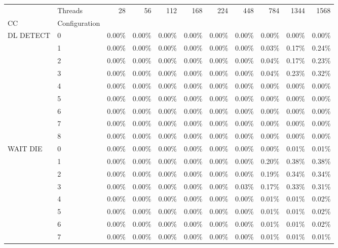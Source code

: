 \begin{tabular}{llrrrrrrrrr}
\toprule
       & Threads &  28   &  56   &  112  &  168  &  224  &  448  &  784  &  1344 &  1568 \\
CC & Configuration &       &       &       &       &       &       &       &       &       \\
\midrule
DL DETECT & 0 & 0.00\% & 0.00\% & 0.00\% & 0.00\% & 0.00\% & 0.00\% & 0.00\% & 0.00\% & 0.00\% \\
       & 1 & 0.00\% & 0.00\% & 0.00\% & 0.00\% & 0.00\% & 0.00\% & 0.03\% & 0.17\% & 0.24\% \\
       & 2 & 0.00\% & 0.00\% & 0.00\% & 0.00\% & 0.00\% & 0.00\% & 0.04\% & 0.17\% & 0.23\% \\
       & 3 & 0.00\% & 0.00\% & 0.00\% & 0.00\% & 0.00\% & 0.00\% & 0.04\% & 0.23\% & 0.32\% \\
       & 4 & 0.00\% & 0.00\% & 0.00\% & 0.00\% & 0.00\% & 0.00\% & 0.00\% & 0.00\% & 0.00\% \\
       & 5 & 0.00\% & 0.00\% & 0.00\% & 0.00\% & 0.00\% & 0.00\% & 0.00\% & 0.00\% & 0.00\% \\
       & 6 & 0.00\% & 0.00\% & 0.00\% & 0.00\% & 0.00\% & 0.00\% & 0.00\% & 0.00\% & 0.00\% \\
       & 7 & 0.00\% & 0.00\% & 0.00\% & 0.00\% & 0.00\% & 0.00\% & 0.00\% & 0.00\% & 0.00\% \\
       & 8 & 0.00\% & 0.00\% & 0.00\% & 0.00\% & 0.00\% & 0.00\% & 0.00\% & 0.00\% & 0.00\% \\
WAIT DIE & 0 & 0.00\% & 0.00\% & 0.00\% & 0.00\% & 0.00\% & 0.00\% & 0.00\% & 0.01\% & 0.01\% \\
       & 1 & 0.00\% & 0.00\% & 0.00\% & 0.00\% & 0.00\% & 0.00\% & 0.20\% & 0.38\% & 0.38\% \\
       & 2 & 0.00\% & 0.00\% & 0.00\% & 0.00\% & 0.00\% & 0.00\% & 0.19\% & 0.34\% & 0.34\% \\
       & 3 & 0.00\% & 0.00\% & 0.00\% & 0.00\% & 0.00\% & 0.03\% & 0.17\% & 0.33\% & 0.31\% \\
       & 4 & 0.00\% & 0.00\% & 0.00\% & 0.00\% & 0.00\% & 0.00\% & 0.01\% & 0.01\% & 0.02\% \\
       & 5 & 0.00\% & 0.00\% & 0.00\% & 0.00\% & 0.00\% & 0.00\% & 0.01\% & 0.01\% & 0.02\% \\
       & 6 & 0.00\% & 0.00\% & 0.00\% & 0.00\% & 0.00\% & 0.00\% & 0.01\% & 0.01\% & 0.02\% \\
       & 7 & 0.00\% & 0.00\% & 0.00\% & 0.00\% & 0.00\% & 0.00\% & 0.01\% & 0.01\% & 0.01\% \\

\end{tabular}
